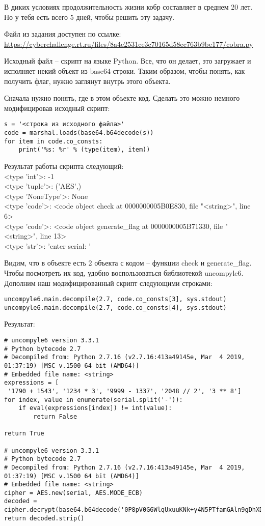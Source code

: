 
В диких условиях продолжительность жизни кобр составляет в среднем 20 лет. Но у тебя есть всего 5 дней, чтобы решить эту задачу.

Файл из задания доступен по ссылке: \url{https://cyberchallenge.rt.ru/files/8a4e2531ce3c70165d58ec763b9be177/cobra.py}

\solutionSection

Исходный файл – скрипт на языке Python. Все, что он делает, это загружает и исполняет некий объект из base64-строки. Таким образом, чтобы понять, как получить флаг, нужно заглянут внутрь этого объекта.

Сначала нужно понять, где в этом объекте код. Сделать это можно немного модифицировав исходный скрипт:

\begin{verbatim}
s = '<строка из исходного файла>'
code = marshal.loads(base64.b64decode(s))
for item in code.co_consts: 
    print('%s: %r' % (type(item), item))
\end{verbatim}

Результат работы скрипта следующий:\\
<type 'int'>: -1\\
<type 'tuple'>: ('AES',)\\
<type 'NoneType'>: None\\
<type 'code'>: <code object check at 0000000005B0E830, file "<string>", line 6>\\
<type 'code'>: <code object generate\_flag at 0000000005B71330, file "<string>", line 13>\\
<type 'str'>: 'enter serial: '

Видим, что в объекте есть 2 объекта с кодом – функции check и generate\_flag. Чтобы посмотреть их код, удобно воспользоваться библиотекой uncompyle6. Дополним наш модифицированный скрипт следующими строками:

\begin{verbatim}
uncompyle6.main.decompile(2.7, code.co_consts[3], sys.stdout)
uncompyle6.main.decompile(2.7, code.co_consts[4], sys.stdout)
\end{verbatim}

Результат:
\begin{verbatim}
# uncompyle6 version 3.3.1
# Python bytecode 2.7
# Decompiled from: Python 2.7.16 (v2.7.16:413a49145e, Mar  4 2019, 01:37:19) [MSC v.1500 64 bit (AMD64)]
# Embedded file name: <string>
expressions = [
 '1790 + 1543', '1234 * 3', '9999 - 1337', '2048 // 2', '3 ** 8']
for index, value in enumerate(serial.split('-')):
    if eval(expressions[index]) != int(value):
        return False

return True

# uncompyle6 version 3.3.1
# Python bytecode 2.7
# Decompiled from: Python 2.7.16 (v2.7.16:413a49145e, Mar  4 2019, 01:37:19) [MSC v.1500 64 bit (AMD64)]
# Embedded file name: <string>
cipher = AES.new(serial, AES.MODE_ECB)
decoded = cipher.decrypt(base64.b64decode('0P8pV0G6WlqUxuuKNk+y4N5PTfamGAln9gDhXDxi5rM='))
return decoded.strip()
\end{verbatim}

